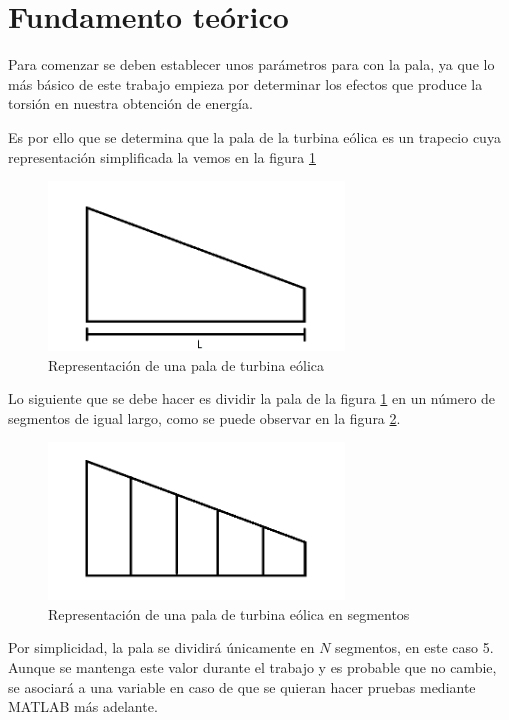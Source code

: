 \section{Fundamento teórico}

Para comenzar se deben establecer unos parámetros para con la pala, ya que lo más básico de este trabajo empieza por determinar los efectos que produce la torsión en nuestra obtención de energía.

Es por ello que se determina que la pala de la turbina eólica es un trapecio cuya representación simplificada la vemos en la figura \ref{fig:pala_simp}

\begin{figure}[H]
    \centering
    \includegraphics[width=0.7\textwidth]{images/pala turbina paint.png}
    \caption{Representación de una pala de turbina eólica}
    \label{fig:pala_simp}
\end{figure}


Lo siguiente que se debe hacer es dividir la pala de la figura \ref{fig:pala_simp} en un número de segmentos de igual largo, como se puede observar en la figura \ref{fig:pala_dividida}.
    \textbf{}
    \begin{figure}[H]
    \centering
    \includegraphics[width=0.7\textwidth]{images/pala dividida.png}
    \caption{Representación de una pala de turbina eólica en segmentos}
    \label{fig:pala_dividida}
\end{figure}

Por simplicidad, la pala se dividirá únicamente en $N$ segmentos, en este caso 5. Aunque se mantenga este valor durante el trabajo y es probable que no cambie, se asociará a una variable en caso de que se quieran hacer pruebas mediante MATLAB más adelante.
    
